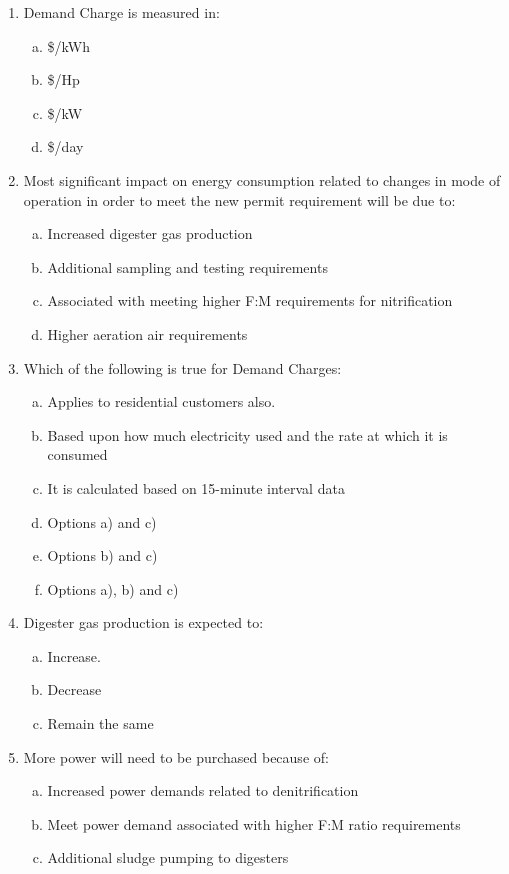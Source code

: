 \begin{enumerate}
\begin{enumerate}[1.]
\item Demand Charge is measured in:
\begin{enumerate}[a).]
\item \$/kWh
\item \$/Hp
\item \$/kW
\item \$/day
\end{enumerate}
\item Most significant impact on energy consumption related to changes in mode of operation in order to meet the new permit requirement will be due to:
\begin{enumerate}[a).]
\item Increased digester gas production
\item Additional sampling and testing requirements
\item Associated with meeting higher F:M requirements for nitrification
\item Higher aeration air requirements
\end{enumerate}
\item Which of the following is true for Demand Charges:
\begin{enumerate}[a).]
\item Applies to residential customers also.
\item Based upon how much electricity used and the rate at which it is consumed
\item It is calculated based on 15-minute interval data
\item Options a) and c)
\item Options b) and c)
\item Options a), b) and c)
\end{enumerate}
\item Digester gas production is expected to:
\begin{enumerate}[a).]
\item Increase.
\item Decrease
\item Remain the same
\end{enumerate}
\item More power will need to be purchased because of:
\begin{enumerate}[a).]
\item Increased power demands related to denitrification
\item Meet power demand associated with higher F:M ratio requirements
\item Additional sludge pumping to digesters

\end{enumerate}
\end{enumerate}
\end{enumerate}

